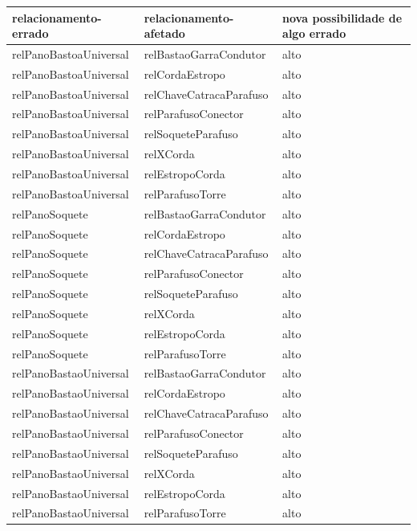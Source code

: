 \documentclass[12pt]{article}
\begin{document}
\begin{table}[H]
\centering
{}
\begin{tabular}{|l|l|l|}
\hline
\textbf{relacionamento-errado} & \textbf{relacionamento-afetado} & \textbf{nova possibilidade de algo errado} \\ \hline
relPanoBastoaUniversal & relBastaoGarraCondutor & alto \\ \hline
relPanoBastoaUniversal & relCordaEstropo & alto \\ \hline
relPanoBastoaUniversal & relChaveCatracaParafuso & alto \\ \hline
relPanoBastoaUniversal & relParafusoConector & alto \\ \hline
relPanoBastoaUniversal & relSoqueteParafuso & alto \\ \hline
relPanoBastoaUniversal & relXCorda & alto \\ \hline
relPanoBastoaUniversal & relEstropoCorda & alto \\ \hline
relPanoBastoaUniversal & relParafusoTorre & alto \\ \hline
relPanoSoquete & relBastaoGarraCondutor & alto \\ \hline
relPanoSoquete & relCordaEstropo & alto \\ \hline
relPanoSoquete & relChaveCatracaParafuso & alto \\ \hline
relPanoSoquete & relParafusoConector & alto \\ \hline
relPanoSoquete & relSoqueteParafuso & alto \\ \hline
relPanoSoquete & relXCorda & alto \\ \hline
relPanoSoquete & relEstropoCorda & alto \\ \hline
relPanoSoquete & relParafusoTorre & alto \\ \hline
relPanoBastaoUniversal & relBastaoGarraCondutor & alto \\ \hline
relPanoBastaoUniversal & relCordaEstropo & alto \\ \hline
relPanoBastaoUniversal & relChaveCatracaParafuso & alto \\ \hline
relPanoBastaoUniversal & relParafusoConector & alto \\ \hline
relPanoBastaoUniversal & relSoqueteParafuso & alto \\ \hline
relPanoBastaoUniversal & relXCorda & alto \\ \hline
relPanoBastaoUniversal & relEstropoCorda & alto \\ \hline
relPanoBastaoUniversal & relParafusoTorre & alto \\ \hline

\end{tabular}
\end{table}
\end{document}
